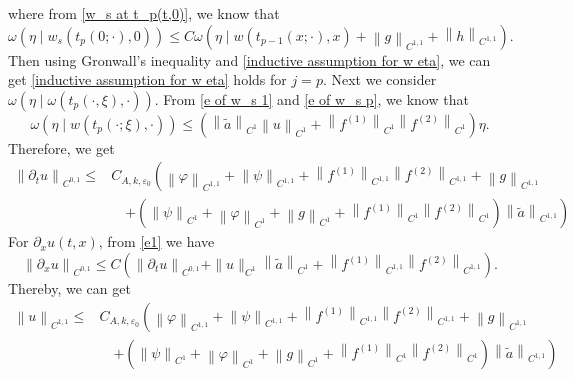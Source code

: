\documentclass[a4paper,reqno,11pt]{amsart}
\numberwithin{equation}{section} %
\begin{document}
where from \eqref{w_s at t_p(t,0)}, we know that
$$
\omega \left( \eta \mid w_s\left( t_p\left( 0;\cdot \right) ,0 \right) \right) \leq C \omega \left( \eta \mid w\left( t_{p-1}\left( x;\cdot \right) ,x \right) +\left\| g \right\| _{C^{1,1}}+\left\| h \right\| _{C^{1,1}} \right)  .
$$
Then using Gronwall's inequality and \eqref{inductive assumption for w eta}, we can get \eqref{inductive assumption for w eta} holds for $j=p$.
Next we consider $\omega\left(\eta \mid \omega\left(t_p(\cdot, \xi), \cdot\right)\right)$.
From \eqref{e of w_s 1} and \eqref{e of w_s p}, we know that
$$
\omega \left( \eta \mid w\left( t_p(\cdot ;\xi ),\cdot \right) \right) \leq \left( \left\| \tilde{a} \right\| _{C^1}\left\lVert u\right\rVert  _{C^1}+\left\| f^{(1)} \right\| _{C^1}\left\| f^{(2)} \right\| _{C^1} \right) \eta .
$$
Therefore, we get
\begin{equation}
\begin{aligned}
\left\| \partial _t u \right\| _{C^{0,1}}\leq&  C_{A,k,\varepsilon _0}\left( \left\| \varphi \right\| _{C^{1,1}}+\left\| \psi \right\| _{C^{1,1}}+\left\| f^{(1)} \right\| _{C^{1,1}}\left\| f^{(2)} \right\| _{C^{1,1}}+\left\| g \right\| _{C^{1,1}}\right.\\
&\quad \left.+(\left\| \psi \right\| _{C^1}+\left\| \varphi \right\| _{C^1}+\left\| g \right\| _{C^1}+\left\| f^{(1)} \right\| _{C^1}\left\| f^{(2)} \right\| _{C^1})\left\| \tilde{a} \right\| _{C^{1,1}} \right) 
\end{aligned}
\end{equation}
For $\partial _xu(t,x)$, from \eqref{e1} we have
$$
\left\| \partial _xu \right\| _{C^{0,1}}\leq C\left( \left\| \partial _tu \right\| _{C^{0,1}}+\parallel u\parallel _{C^1}\left\| \tilde{a} \right\| _{C^1}+\left\| f^{(1)} \right\| _{C^{1,1}}\left\| f^{(2)} \right\| _{C^{1,1}} \right) .
$$
Thereby, we can get
\begin{equation}\label{continuity paradigm}
\begin{aligned}
\left\| u \right\| _{C^{1,1}}\leq & C_{A,k,\varepsilon _0}\left( \left\| \varphi \right\| _{C^{1,1}}+\left\| \psi \right\| _{C^{1,1}}+\left\| f^{(1)} \right\| _{C^{1,1}}\left\| f^{(2)} \right\| _{C^{1,1}}+\left\| g \right\| _{C^{1,1}}\right.\\
&\quad \left.+(\left\| \psi \right\| _{C^1}+\left\| \varphi \right\| _{C^1}+\left\| g \right\| _{C^1}+\left\| f^{(1)} \right\| _{C^1}\left\| f^{(2)} \right\| _{C^1})\left\| \tilde{a} \right\| _{C^{1,1}} \right) 
\end{aligned}
\end{equation}
\end{document}

